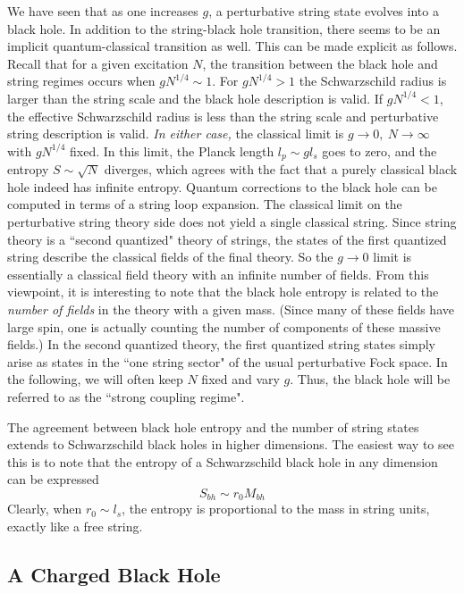\documentclass[12pt]{article}
\newcommand{\eq}{\begin{equation}}
\newcommand{\eqe}{\end{equation}}
\begin{document}
We have seen that as one increases $g$, a perturbative string state
evolves into a black hole.
In addition to the string-black hole transition,
there seems to be an implicit quantum-classical transition as well.
This can be made explicit as follows. Recall that for a given excitation $N$, 
the transition between the black hole and string regimes
occurs when $g N^{1/4} \sim 1$. For $g N^{1/4} > 1$ the
Schwarzschild radius is larger than the string scale and the black hole
description is valid. If $g N^{1/4}<1$, the
effective Schwarzschild radius is less than the string scale and
perturbative string description is valid. {\it In either case,} the
classical limit is $g\rightarrow 0,\ N\rightarrow \infty$ with
$g N^{1/4}$ fixed. In this limit, the Planck length $l_p \sim g l_s$
goes to zero, and the entropy $S \sim \sqrt N$ diverges, which agrees
with the fact that a purely classical black hole indeed has infinite
entropy. Quantum corrections to the black 
hole can be computed in terms of a string loop expansion. 
The classical limit on the
perturbative string theory side does not yield a single classical string.
Since string theory is a ``second quantized" theory of strings, the states of
the first 
quantized string describe the classical fields of the final theory. 
So the $g\to0$ limit is essentially a classical field theory with an
infinite number of fields. From this viewpoint,
it is interesting to note that the
black hole entropy is related to the {\it number of fields} in the theory
with a given mass. (Since many of these fields have large spin, one is
actually counting the number of components of these massive fields.)
In the second quantized theory, the first quantized string
states simply arise as states in the ``one string sector" of the
usual perturbative 
Fock space. 
In the following, we will often keep $N$ fixed and vary $g$. Thus, the
black hole will be referred to as the ``strong coupling regime".


The agreement between black hole entropy and the number of string
states  extends to Schwarzschild black holes in higher dimensions.
The easiest way to see this is to note that the entropy of a
Schwarzschild black hole in any dimension can be expressed 
\eq
S_{bh} \sim r_0 M_{bh}
\eqe
Clearly, when $r_0 \sim l_s$, the entropy
is proportional to the mass in string units, exactly like a free string.

\subsection{A Charged Black Hole}
\end{document}
